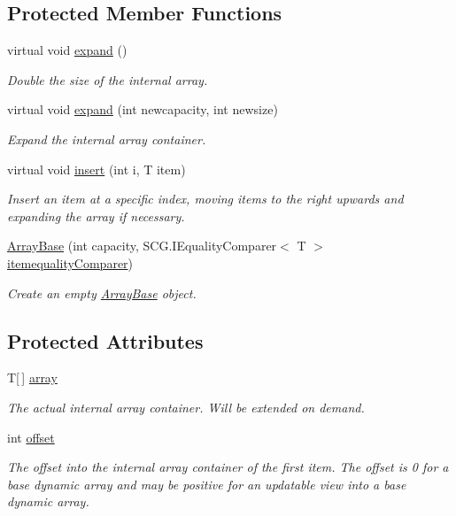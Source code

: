 \subsection*{Protected Member Functions}
\begin{DoxyCompactItemize}
\item 
virtual void \hyperlink{class_c5_1_1_array_base_a6e32bc0bafd9263e2ccb18a5fedb032d}{expand} ()
\begin{DoxyCompactList}\small\item\em Double the size of the internal array. \end{DoxyCompactList}\item 
virtual void \hyperlink{class_c5_1_1_array_base_a5f2dcfe8c4c68077aa1b6c80a2d179c6}{expand} (int newcapacity, int newsize)
\begin{DoxyCompactList}\small\item\em Expand the internal array container. \end{DoxyCompactList}\item 
virtual void \hyperlink{class_c5_1_1_array_base_a5e47a614cf3a44d6657b5fa89e2ac26c}{insert} (int i, T item)
\begin{DoxyCompactList}\small\item\em Insert an item at a specific index, moving items to the right upwards and expanding the array if necessary. \end{DoxyCompactList}\item 
\hyperlink{class_c5_1_1_array_base_ae5aadcdb3a4f02dc7c00beff944970ba}{Array\+Base} (int capacity, S\+C\+G.\+I\+Equality\+Comparer$<$ T $>$ \hyperlink{class_c5_1_1_collection_base_a95e343400be0e8f3f8d6310f1aaf2cc6}{itemequality\+Comparer})
\begin{DoxyCompactList}\small\item\em Create an empty \hyperlink{class_c5_1_1_array_base}{Array\+Base} object. \end{DoxyCompactList}\end{DoxyCompactItemize}
\subsection*{Protected Attributes}
\begin{DoxyCompactItemize}
\item 
T\mbox{[}$\,$\mbox{]} \hyperlink{class_c5_1_1_array_base_a93d269a72f2299ba18b61ceb65590bdf}{array}
\begin{DoxyCompactList}\small\item\em The actual internal array container. Will be extended on demand. \end{DoxyCompactList}\item 
int \hyperlink{class_c5_1_1_array_base_a2fff33ea372907c015262a3041b2f2af}{offset}
\begin{DoxyCompactList}\small\item\em The offset into the internal array container of the first item. The offset is 0 for a base dynamic array and may be positive for an updatable view into a base dynamic array. \end{DoxyCompactList}\end{DoxyCompactItemize}
